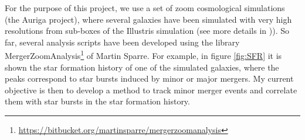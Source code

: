 \documentclass[a4,useAMS,usenatbib,usegraphicx,12pt]{article}
\begin{document}
For the purpose of this project, we use a set of zoom cosmological simulations 
(the Auriga project), where several galaxies have been simulated with very high
resolutions from sub-boxes of the Illustris simulation (see more details in
\citet{Grand16})). So far, several analysis scripts have been developed using 
the library MergerZoomAnalysis\footnote{
\url{https://bitbucket.org/martinsparre/mergerzoomanalysis}} of Martin Sparre. 
For example, in figure \ref{fig:SFR} it is shown the star formation history of 
one of the simulated galaxies, where the peaks correspond to star bursts induced 
by minor or major mergers. My current objective is then to develop a method to 
track minor merger events and correlate them with star bursts in the star 
formation history.



\renewcommand{\bibname}{8\ \ \ \ Bibliography}
\small

\end{document}
